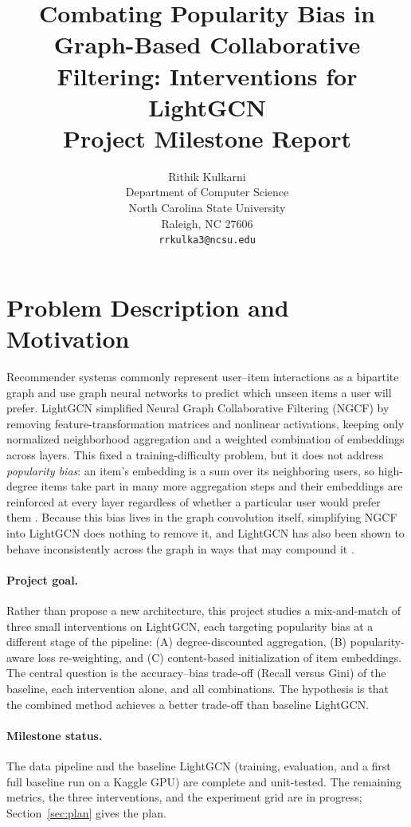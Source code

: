 \documentclass{article}
\title{Combating Popularity Bias in Graph-Based Collaborative Filtering: Interventions for LightGCN \\ \large Project Milestone Report}
\author{%
  Rithik Kulkarni \\
  Department of Computer Science\\
  North Carolina State University\\
  Raleigh, NC 27606 \\
  \texttt{rrkulka3@ncsu.edu}
}
\begin{document}
\maketitle

\section{Problem Description and Motivation}

Recommender systems commonly represent user--item interactions as a bipartite graph and use graph neural networks to predict which unseen items a user will prefer. LightGCN \citep{he2020lightgcn} simplified Neural Graph Collaborative Filtering (NGCF) \citep{wang2019ngcf} by removing feature-transformation matrices and nonlinear activations, keeping only normalized neighborhood aggregation and a weighted combination of embeddings across layers. This fixed a training-difficulty problem, but it does not address \emph{popularity bias}: an item's embedding is a sum over its neighboring users, so high-degree items take part in many more aggregation steps and their embeddings are reinforced at every layer regardless of whether a particular user would prefer them \citep{klimashevskaia2024survey}. Because this bias lives in the graph convolution itself, simplifying NGCF into LightGCN does nothing to remove it, and LightGCN has also been shown to behave inconsistently across the graph in ways that may compound it \citep{lee2024revisiting}.

\paragraph{Project goal.} Rather than propose a new architecture, this project studies a mix-and-match of three small interventions on LightGCN, each targeting popularity bias at a different stage of the pipeline: (A) degree-discounted aggregation, (B) popularity-aware loss re-weighting, and (C) content-based initialization of item embeddings. The central question is the accuracy--bias trade-off (Recall versus Gini) of the baseline, each intervention alone, and all combinations. The hypothesis is that the combined method achieves a better trade-off than baseline LightGCN.

\paragraph{Milestone status.} The data pipeline and the baseline LightGCN (training, evaluation, and a first full baseline run on a Kaggle GPU) are complete and unit-tested. The remaining metrics, the three interventions, and the experiment grid are in progress; Section~\ref{sec:plan} gives the plan.
\end{document}
